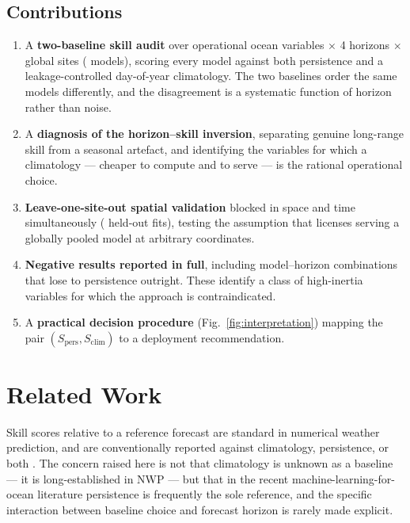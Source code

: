 \subsection{Contributions}

\begin{enumerate}\itemsep2pt
\item A \textbf{two-baseline skill audit} over \NVars{} operational ocean
variables $\times$ 4 horizons $\times$ \NSites{} global sites (\NModels{}
models), scoring every model against both persistence and a
leakage-controlled day-of-year climatology. The two baselines order the same
models differently, and the disagreement is a systematic function of horizon
rather than noise.
\item A \textbf{diagnosis of the horizon--skill inversion}, separating genuine
long-range skill from a seasonal artefact, and identifying the variables for
which a climatology --- cheaper to compute and to serve --- is the rational
operational choice.
\item \textbf{Leave-one-site-out spatial validation} blocked in space and time
simultaneously (\NLosoFits{} held-out fits), testing the assumption that
licenses serving a globally pooled model at arbitrary coordinates.
\item \textbf{Negative results reported in full}, including \NLoseToPers{}
model--horizon combinations that lose to persistence outright. These identify
a class of high-inertia variables for which the approach is contraindicated.
\item A \textbf{practical decision procedure} (Fig.~\ref{fig:interpretation})
mapping the pair $(S_{\mathrm{pers}}, S_{\mathrm{clim}})$ to a deployment
recommendation.
\end{enumerate}

\section{Related Work}

Skill scores relative to a reference forecast are standard in numerical weather
prediction, and are conventionally reported against climatology, persistence,
or both \citep{jolliffe2012,murphy1988}. The concern raised here is not that
climatology is unknown as a baseline --- it is long-established in NWP --- but
that in the recent machine-learning-for-ocean literature persistence is
frequently the sole reference, and the specific interaction between baseline
choice and forecast horizon is rarely made explicit.

